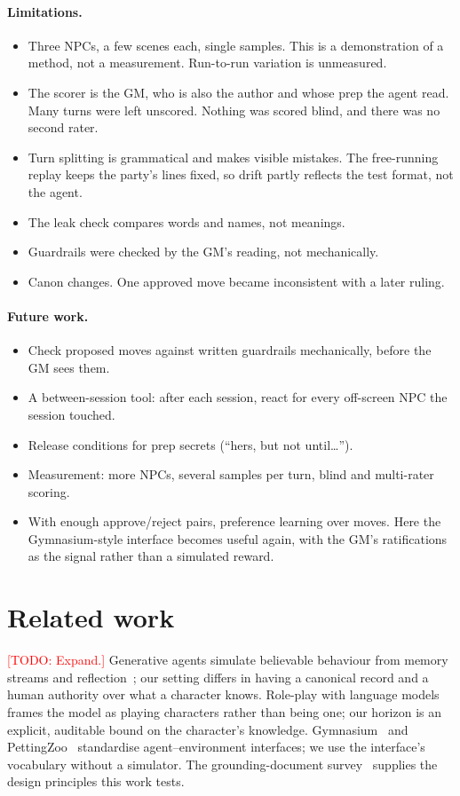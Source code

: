 \documentclass[11pt]{article}
\newcommand{\todo}[1]{\textcolor{red}{[TODO: #1]}}
\begin{document}
\paragraph{Limitations.}
\begin{itemize}[nosep]
\item Three NPCs, a few scenes each, single samples. This is a demonstration of a
method, not a measurement. Run-to-run variation is unmeasured.
\item The scorer is the GM, who is also the author and whose prep the agent read. Many
turns were left unscored. Nothing was scored blind, and there was no second rater.
\item Turn splitting is grammatical and makes visible mistakes. The free-running
replay keeps the party's lines fixed, so drift partly reflects the test format, not
the agent.
\item The leak check compares words and names, not meanings.
\item Guardrails were checked by the GM's reading, not mechanically.
\item Canon changes. One approved move became inconsistent with a later ruling.
\end{itemize}

\paragraph{Future work.}
\begin{itemize}[nosep]
\item Check proposed moves against written guardrails mechanically, before the GM
sees them.
\item A between-session tool: after each session, react for every off-screen NPC the
session touched.
\item Release conditions for prep secrets (``hers, but not until\ldots'').
\item Measurement: more NPCs, several samples per turn, blind and multi-rater
scoring.
\item With enough approve/reject pairs, preference learning over moves. Here the
Gymnasium-style interface becomes useful again, with the GM's ratifications as the
signal rather than a simulated reward.
\end{itemize}

\section{Related work}
\todo{Expand.} Generative agents simulate believable behaviour from memory streams and
reflection~\citep{park2023generative}; our setting differs in having a canonical
record and a human authority over what a character knows. Role-play with language
models~\citep{shanahan2023roleplay} frames the model as playing characters rather than
being one; our horizon is an explicit, auditable bound on the character's knowledge.
Gymnasium~\citep{towers2024gymnasium} and PettingZoo~\citep{terry2021pettingzoo}
standardise agent--environment interfaces; we use the interface's vocabulary without a
simulator. The grounding-document survey~\citep{roussos2026grounding} supplies the
design principles this work tests.
\end{document}
